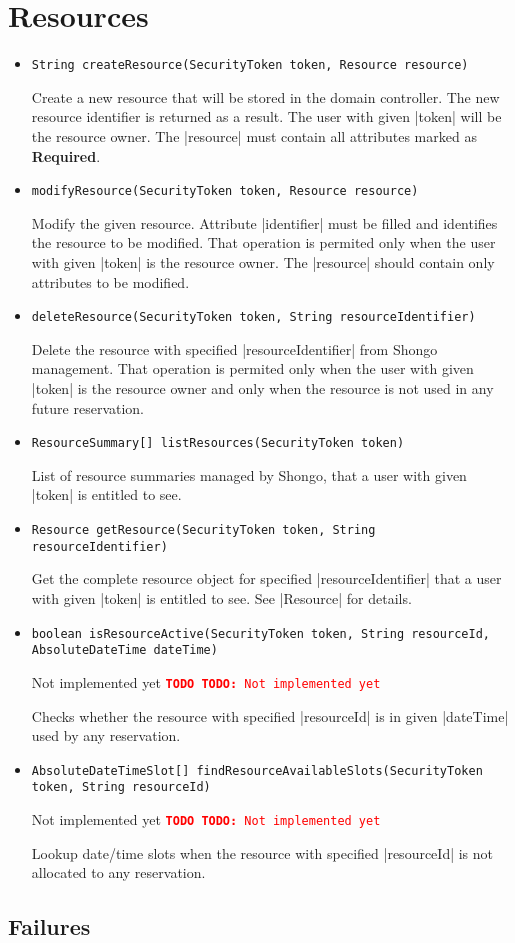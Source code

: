\documentclass[a4paper]{report}
\newenvironment{Api}{\begin{itemize}}{\end{itemize}}
\newcommand{\ApiCode}[1]{\lstinline[style=styleApi]|#1|}
\newcommand{\ApiItem}[1]{\item #1 %

}
\newcommand{\ApiCmd}[1]{\ApiItem{\ApiCode{#1}}}
\newcommand{\ApiRequired}{{\color{blue!50!black}\textbf{Required}}}
\newcommand{\TODO}[1]{%
\def\empty{}%
\def\prvniparametr{#1}%
\ifx\prvniparametr\empty%
\begingroup\tt\textcolor{red}{\noindent\textbf{TODO}}\endgroup
\else%
\begingroup\tt\textcolor{red}{\noindent\textbf{TODO:}\ #1}\endgroup
\fi%
}
\begin{document}
\section{Resources}

\begin{Api}

\ApiCmd{String createResource(SecurityToken token, Resource resource)}
Create a new resource that will be stored in the domain controller. The new resource identifier is returned as a result. The user with given |token| will be the resource owner. The |resource| must contain all attributes marked as \ApiRequired.

\ApiCmd{modifyResource(SecurityToken token, Resource resource)}
Modify the given resource. Attribute |identifier| must be filled and identifies the resource to be modified. That operation is permited only when the user with given |token| is the resource owner. The |resource| should contain only attributes to be modified.

\ApiCmd{deleteResource(SecurityToken token, String resourceIdentifier)}
Delete the resource with specified |resourceIdentifier| from Shongo management. That operation is permited only when the user with given |token| is the resource owner and only when the resource is not used in any future reservation.

\ApiCmd{ResourceSummary[] listResources(SecurityToken token)}
List of resource summaries managed by Shongo, that a user with given |token| is entitled to see.

\ApiCmd{Resource getResource(SecurityToken token, String resourceIdentifier)}
Get the complete resource object for specified |resourceIdentifier| that a user with given |token| is entitled to see. See |Resource| for details.

\ApiCmd{boolean isResourceActive(SecurityToken token, String resourceId, AbsoluteDateTime dateTime)}
\TODO{Not implemented yet}
Checks whether the resource with specified |resourceId| is in given |dateTime| used by any reservation.

\ApiCmd{AbsoluteDateTimeSlot[] findResourceAvailableSlots(SecurityToken token, String resourceId)}
\TODO{Not implemented yet}
Lookup date/time slots when the resource with specified |resourceId| is not allocated to any reservation.


\end{Api}

\subsection{Failures}
\end{document}
